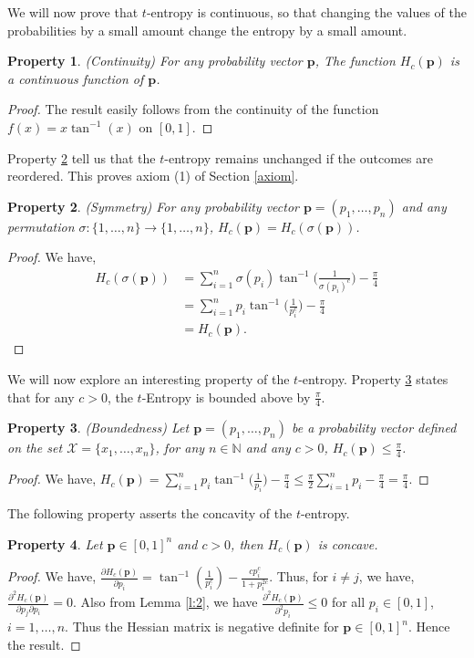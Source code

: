 \documentclass{article}
\newcommand{\bp}{\boldsymbol{p}}
\newtheorem{prop}{Property}
\begin{document}
We will now prove that $t$-entropy is continuous, so that changing the values of the probabilities by a small amount change the entropy by a small amount.
\begin{prop}
(Continuity) For any probability vector $\bp$, The function $H_c(\bp)$ is a continuous function of $\bp$.
\end{prop}
\begin{proof}
The result easily follows from the continuity of the function $f(x)=x\tan^{-1}(x)$ on $[0,1]$.
\end{proof}

Property \ref{p:sym} tell us that the $t$-entropy remains unchanged if the outcomes are reordered. This proves axiom (1) of Section \ref{axiom}.
\begin{prop}
\label{p:sym}
(Symmetry) For any probability vector $\bp=(p_1,\dots,p_n)$ and any permutation $\sigma:\{1,\dots,n\} \to \{1,\dots,n\}$, $H_c(\bp)=H_c(\sigma(\bp))$.
\end{prop}
\begin{proof}
We have,
\begin{align*}
    H_c(\sigma(\bp)) & =\sum_{i=1}^n \sigma(p_i) \tan^{-1}\bigg(\frac{1}{\sigma(p_i)^c}\bigg) -\frac{\pi}{4}\\
    & =\sum_{i=1}^n p_i \tan^{-1}\bigg(\frac{1}{p_i^c}\bigg)-\frac{\pi}{4}\\
    & = H_c(\bp).
\end{align*}
\end{proof}

We will now explore an interesting property of the $t$-entropy. Property \ref{p:2} states that for any $c>0$, the $t$-Entropy is bounded above by $\frac{\pi}{4}.$ 

\begin{prop}
 \label{p:2}
 (Boundedness) Let $\bp=(p_1,\dots,p_n)$ be a probability vector defined on the set $\mathcal{X}=\{x_1,\dots,x_n\}$, for any $n \in \mathbb{N}$ and any $c>0$, $H_{c}(\bp) \leq \frac{\pi}{4}$.
\end{prop}
\begin{proof}
We have, $H_c(\bp)=\sum_{i=1}^n p_i \tan^{-1}\bigg(\frac{1}{p_i}\bigg) - \frac{\pi}{4} \leq  \frac{\pi}{2}\sum_{i=1}^n p_i - \frac{\pi}{4}=\frac{\pi}{4}. $
\end{proof}

The following property asserts the concavity of the $t$-entropy.

\begin{prop}
\label{p:3}
 Let $\bp \in [0,1]^n$ and $c>0$, then $H_c(\bp)$ is concave.
\end{prop}
\begin{proof}
We have, $\frac{\partial H_c(\bp)}{\partial p_i} = \tan^{-1}(\frac{1}{p_i^c})-\frac{c p_i^c}{1+p_i^{2c}}$. Thus, for $i \neq j$, we have, $\frac{\partial^2 H_c(\bp)}{\partial p_j \partial p_i}=0$. Also from Lemma \ref{l:2}, we have $\frac{\partial^2 H_c(\bp)}{\partial^2 p_i} \leq 0$ for all $p_i \in [0,1]$, $i=1, \dots, n$. Thus the Hessian matrix is negative definite for $\bp \in [0,1]^n$. Hence the result.
\end{proof}
\end{document}
